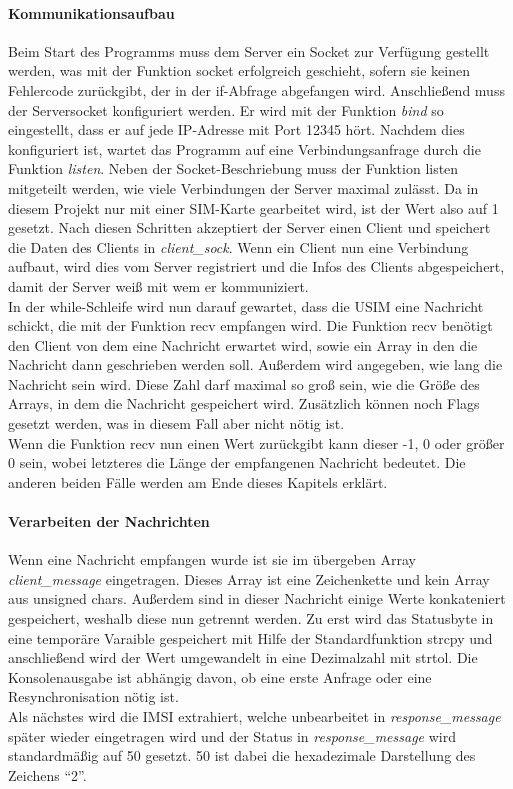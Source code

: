 		\paragraph{Kommunikationsaufbau}
		Beim Start des Programms muss dem Server ein Socket zur Verfügung gestellt werden, was mit der Funktion
		socket erfolgreich geschieht, sofern sie keinen Fehlercode zurückgibt, der in der if-Abfrage abgefangen wird.
		Anschließend muss	der Serversocket konfiguriert werden. Er wird mit der Funktion \emph{bind} so eingestellt, dass er
		auf jede IP-Adresse mit Port 12345 hört. Nachdem dies konfiguriert ist, wartet das Programm auf eine Verbindungsanfrage
		durch die Funktion \emph{listen}. Neben der Socket-Beschriebung muss der Funktion listen mitgeteilt werden, wie viele Verbindungen
		der Server maximal zulässt. Da in diesem Projekt nur mit einer SIM-Karte gearbeitet wird, ist der Wert also auf 1 gesetzt.
		Nach diesen Schritten akzeptiert der Server einen Client und speichert die Daten des Clients in \emph{client\_sock}.
		Wenn ein Client nun eine Verbindung aufbaut, wird dies vom Server registriert und die Infos des Clients abgespeichert,
		damit der Server weiß mit wem er kommuniziert. \\
		In der while-Schleife wird nun darauf gewartet, dass die USIM eine Nachricht schickt, die mit der Funktion recv empfangen
		wird. Die Funktion recv benötigt den Client von dem eine Nachricht erwartet wird, sowie ein Array in den die Nachricht dann
		geschrieben werden soll. Außerdem wird angegeben, wie lang die Nachricht sein wird. Diese Zahl darf maximal
		so groß sein, wie die Größe des Arrays, in dem die Nachricht gespeichert wird. Zusätzlich können noch Flags
		gesetzt werden, was in diesem Fall aber nicht nötig ist. \\
		Wenn die Funktion recv nun einen Wert zurückgibt kann dieser -1, 0 oder größer 0 sein, wobei letzteres die
		Länge der empfangenen Nachricht bedeutet. Die anderen beiden Fälle werden am Ende dieses Kapitels erklärt.
		
		\paragraph{Verarbeiten der Nachrichten}
		Wenn eine Nachricht empfangen wurde ist sie im übergeben Array \emph{client\_message} eingetragen. Dieses
		Array ist eine Zeichenkette und kein Array aus unsigned chars. Außerdem sind in dieser Nachricht einige
		Werte konkateniert gespeichert, weshalb diese nun getrennt werden. Zu erst wird das Statusbyte in eine
		temporäre Varaible gespeichert mit Hilfe der Standardfunktion strcpy und anschließend wird der Wert
		umgewandelt in eine Dezimalzahl mit strtol. Die Konsolenausgabe ist abhängig davon, ob eine erste Anfrage
		oder eine Resynchronisation nötig ist. \\
		Als nächstes wird die IMSI extrahiert, welche unbearbeitet in \emph{response\_message} später wieder
		eingetragen wird und der Status in \emph{response\_message} wird standardmäßig auf 50 gesetzt. 50 ist
		dabei die hexadezimale Darstellung des Zeichens ``2''.
		

